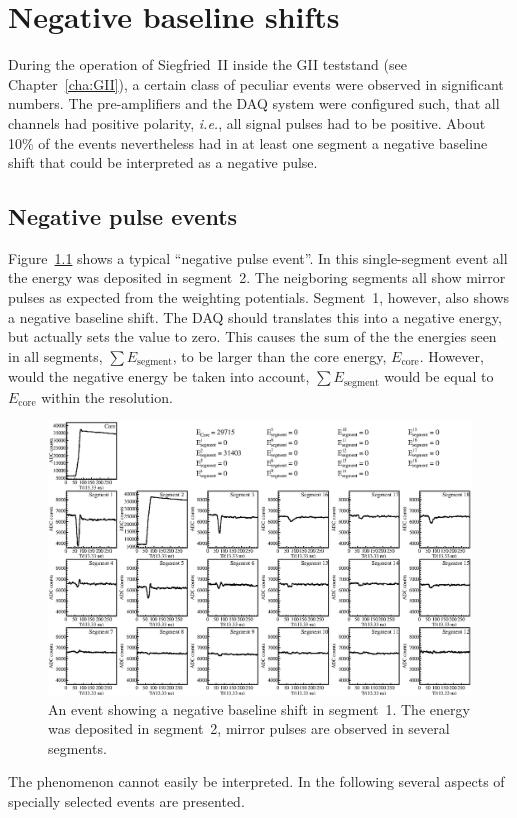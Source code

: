 \chapter{Negative baseline shifts}
\label{cha:np}
During the operation of Siegfried~II inside the GII teststand (see
Chapter~\ref{cha:GII}), a certain class of peculiar events were
observed in significant numbers. The pre-amplifiers and the DAQ system
were configured such, that all channels had positive polarity,
\textit{i.e.}, all signal pulses had to be positive. About 10\% of the
events nevertheless had in at least one segment a negative baseline
shift that could be interpreted as a negative pulse.

\section{Negative pulse events}
\label{sec:np:evt}
Figure~\ref{fig:np:npul} shows a typical ``negative pulse event''. In
this single-segment event all the energy was deposited in
segment~2. The neigboring segments all show mirror pulses as expected
from the weighting potentials. Segment~1, however, also shows a
negative baseline shift. The DAQ should translates this into a
negative energy, but actually sets the value to zero. This causes the
sum of the the energies seen in all segments, $\sum
E_{\text{segment}}$, to be larger than the core energy,
$E_{\text{core}}$. However, would the negative energy be taken into
account, $\sum E_{\text{segment}}$ would be equal to $E_{\text{core}}$
within the resolution.

\begin{figure}
\centering
\includegraphics{npul}
\caption{An event showing a negative baseline shift in segment~1. The
energy was deposited in segment~2, mirror pulses are observed in
several segments.}
\label{fig:np:npul}
\end{figure}
The phenomenon cannot easily be interpreted. In the following several
aspects of specially selected events are presented.

